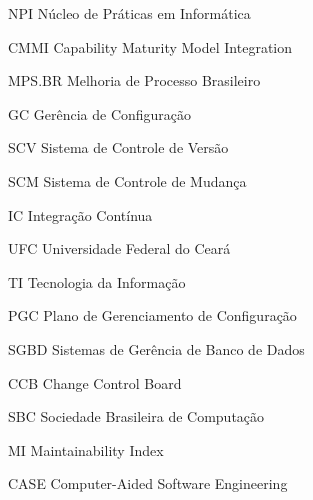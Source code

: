 \begin{siglas}
  \item[NPI] Núcleo de Práticas em Informática
  \item[CMMI] Capability Maturity Model Integration
  \item[MPS.BR] Melhoria de Processo Brasileiro
  \item[GC] Gerência de Configuração
  \item[SCV] Sistema de Controle de Versão
  \item[SCM] Sistema de Controle de Mudança
  \item[IC]  Integração Contínua
  \item[UFC] Universidade Federal do Ceará
  \item[TI] Tecnologia da Informação
  \item[PGC] Plano de Gerenciamento de Configuração
  \item[SGBD] Sistemas de Gerência de Banco de Dados
  \item[CCB] Change Control Board
  \item[SBC] Sociedade Brasileira de Computação
  \item[MI] Maintainability Index 
  \item[CASE] Computer-Aided Software Engineering
\end{siglas}
